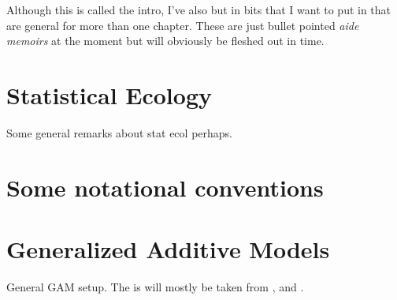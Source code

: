 Although this is called the intro, I've also but in bits that I want to put in that are general for more than one chapter. These are just bullet pointed \emph{aide memoirs} at the moment but will obviously be fleshed out in time.

\section{Statistical Ecology}

Some general remarks about stat ecol perhaps.

%
%


\section{Some notational conventions}


\section{Generalized Additive Models}

General GAM setup. The is will mostly be taken from \cite{simonbook}, \cite{rwc} and \cite{marraradice2010}.

